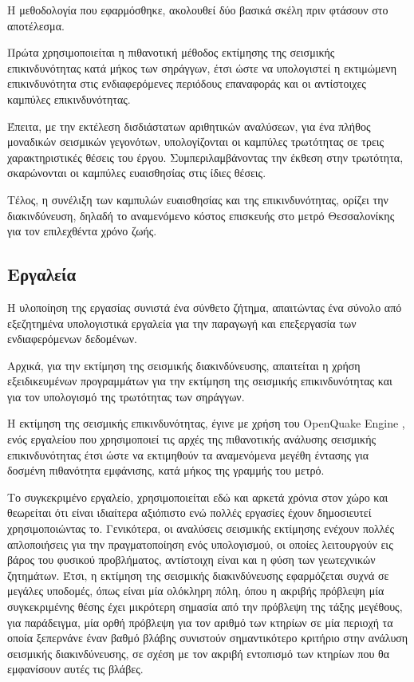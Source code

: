 Η μεθοδολογία που εφαρμόσθηκε, ακολουθεί δύο βασικά σκέλη πριν φτάσουν στο αποτέλεσμα.

Πρώτα χρησιμοποιείται η πιθανοτική μέθοδος εκτίμησης της σεισμικής επικινδυνότητας κατά μήκος των σηράγγων, έτσι ώστε να υπολογιστεί η εκτιμώμενη επικινδυνότητα στις ενδιαφερόμενες περιόδους επαναφοράς και οι αντίστοιχες καμπύλες επικινδυνότητας.

Έπειτα, με την εκτέλεση δισδιάστατων αριθητικών αναλύσεων, για ένα πλήθος μοναδικών σεισμικών γεγονότων, υπολογίζονται οι καμπύλες τρωτότητας σε τρεις χαρακτηριστικές θέσεις του έργου. Συμπεριλαμβάνοντας την έκθεση στην τρωτότητα, σκαρώνονται οι καμπύλες ευαισθησίας στις ίδιες θέσεις.

Τέλος, η συνέλιξη των καμπυλών ευαισθησίας και της επικινδυνότητας, ορίζει την διακινδύνευση, δηλαδή το αναμενόμενο κόστος επισκευής στο μετρό Θεσσαλονίκης για τον επιλεχθέντα χρόνο ζωής.

\subsection{Εργαλεία}
Η υλοποίηση της εργασίας συνιστά ένα σύνθετο ζήτημα, απαιτώντας ένα σύνολο από εξεζητημένα υπολογιστικά εργαλεία για την παραγωγή και επεξεργασία των ενδιαφερόμενων δεδομένων.

Αρχικά, για την εκτίμηση της σεισμικής διακινδύνευσης, απαιτείται η χρήση εξειδικευμένων προγραμμάτων για την εκτίμηση της σεισμικής επικινδυνότητας και για τον υπολογισμό της τρωτότητας των σηράγγων.

Η εκτίμηση της σεισμικής επικινδυνότητας, έγινε με χρήση του OpenQuake Engine \parencite{Pagani}, ενός εργαλείου που χρησιμοποιεί τις αρχές της πιθανοτικής ανάλυσης σεισμικής επικινδυνότητας έτσι ώστε να εκτιμηθούν τα αναμενόμενα μεγέθη έντασης για δοσμένη πιθανότητα εμφάνισης, κατά μήκος της γραμμής του μετρό.

Το συγκεκριμένο εργαλείο, χρησιμοποιείται εδώ και αρκετά χρόνια στον χώρο και θεωρείται ότι είναι ιδιαίτερα αξιόπιστο ενώ πολλές εργασίες έχουν δημοσιευτεί χρησιμοποιώντας το. Γενικότερα, οι αναλύσεις σεισμικής εκτίμησης ενέχουν πολλές απλοποιήσεις για την πραγματοποίηση ενός υπολογισμού, οι οποίες λειτουργούν εις βάρος του φυσικού προβλήματος, αντίστοιχη είναι και η φύση των γεωτεχνικών ζητημάτων. Έτσι, η εκτίμηση της σεισμικής διακινδύνευσης εφαρμόζεται συχνά σε μεγάλες υποδομές, όπως είναι μία ολόκληρη πόλη, όπου η ακριβής πρόβλεψη μία συγκεκριμένης θέσης έχει μικρότερη σημασία από την πρόβλεψη της τάξης μεγέθους, για παράδειγμα, μία ορθή πρόβλεψη για τον αριθμό των κτηρίων σε μία περιοχή τα οποία ξεπερνάνε έναν βαθμό βλάβης συνιστούν σημαντικότερο κριτήριο στην ανάλυση σεισμικής διακινδύνευσης, σε σχέση με τον ακριβή εντοπισμό των κτηρίων που θα εμφανίσουν αυτές τις βλάβες.

